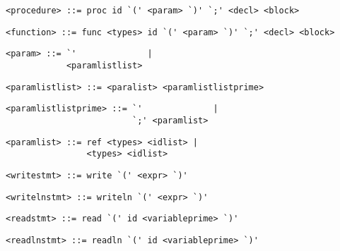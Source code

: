 \begin{footnotesize}
\begin{lstlisting}[frame=single, label={procedure}, language=pie]
<procedure> ::= proc id `(' <param> `)' `;' <decl> <block>
\end{lstlisting}

\begin{lstlisting}[frame=single, label={function}, language=pie]
<function> ::= func <types> id `(' <param> `)' `;' <decl> <block>
\end{lstlisting}

\begin{lstlisting}[frame=single, label={param}, language=pie]
<param> ::= `'              |
            <paramlistlist>
\end{lstlisting}

\begin{lstlisting}[frame=single, label={paramlistlist}, language=pie]
<paramlistlist> ::= <paralist> <paramlistlistprime>
\end{lstlisting}

\begin{lstlisting}[frame=single, label={paramlistlistprime}, language=pie]
<paramlistlistprime> ::= `'              |
                         `;' <paramlist>
\end{lstlisting}

\begin{lstlisting}[frame=single, label={paramlist}, language=pie]
<paramlist> ::= ref <types> <idlist> |
                <types> <idlist>
\end{lstlisting}

\begin{lstlisting}[frame=single, label={writestmt}, language=pie]
<writestmt> ::= write `(' <expr> `)'
\end{lstlisting}

\begin{lstlisting}[frame=single, label={writelnstmt}, language=pie]
<writelnstmt> ::= writeln `(' <expr> `)'
\end{lstlisting}

\begin{lstlisting}[frame=single, label={readstmt}, language=pie]
<readstmt> ::= read `(' id <variableprime> `)'
\end{lstlisting}

\begin{lstlisting}[frame=single, label={readlnstmt}, language=pie]
<readlnstmt> ::= readln `(' id <variableprime> `)'
\end{lstlisting}
\end{footnotesize}
